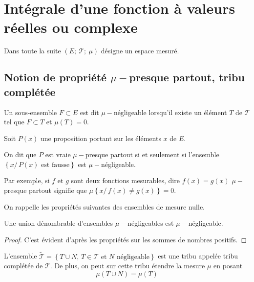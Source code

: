 \section{Intégrale d'une fonction à valeurs réelles ou complexe}

Dans toute la suite $\left(E;~\mathcal{T};~\mu\right)$ désigne un espace mesuré.

\subsection{Notion de propriété $\mu-$presque partout, tribu complétée}

\begin{de}
Un sous-ensemble $F \subset E$ est dit $\mu-$négligeable lorsqu'il existe un élément $T$ de $\mathcal{T}$ tel que $F \subset T$ et $\mu(T)=0$.
\end{de}

Soit $P(x)$ une proposition portant sur les éléments $x$ de $E$.

On dit que $P$ est vraie $\mu-$presque partout si et seulement si l'ensemble $\left\{ x / \, P(x) \text{ est fausse}\right \}$ est $\mu-$négligeable.

Par exemple, si $f$ et $g$ sont deux fonctions mesurables, dire $f(x)=g(x)$ $\mu-$presque partout signifie que $\mu\left\{x/  \, f(x) \neq g(x)\right\} = 0$.

On rappelle les propriétés suivantes des ensembles de mesure nulle.


\begin{prop}
Une union dénombrable d'ensembles $\mu-$négligeables est $\mu-$négligeable.
\end{prop}

\begin{proof}
C'est évident d'après les propriétés sur les sommes de nombres positifs.
\end{proof}


\begin{de}
L'ensemble $\tilde{\mathcal{T}}=\left\{T \cup N, \, T \in \mathcal{T} \text{ et }N \text{ négligeable}\right\}$ est une tribu appelée tribu complétée de $\mathcal{T}$. De plus, on peut sur cette tribu étendre la mesure $\mu$ en posant
\[\mu\left(T \cup N\right) = \mu(T)\]
\end{de}

